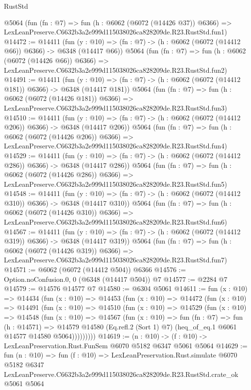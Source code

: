 \begin{lexlean}{RustStd}
\begin{coremodule}
    @5064
    (fun (fn : @7) =>
    fun (h : @6062 (@6072 (@14426 @37)) @6366) =>
    LexLeanPreserve.C6632b3a2e999d115038026ca828209de.R23.RustStd.fun1)
@14472 := @14411
    (fun (y : @10) => (fn : @7) -> (h : @6062 (@6072 (@14412 @66)) @6366) -> @6348 (@14417 @66))
    @5064
    (fun (fn : @7) =>
    fun (h : @6062 (@6072 (@14426 @66)) @6366) =>
    LexLeanPreserve.C6632b3a2e999d115038026ca828209de.R23.RustStd.fun2)
@14491 := @14411
    (fun (y : @10) => (fn : @7) -> (h : @6062 (@6072 (@14412 @181)) @6366) -> @6348 (@14417 @181))
    @5064
    (fun (fn : @7) =>
    fun (h : @6062 (@6072 (@14426 @181)) @6366) =>
    LexLeanPreserve.C6632b3a2e999d115038026ca828209de.R23.RustStd.fun3)
@14510 := @14411
    (fun (y : @10) => (fn : @7) -> (h : @6062 (@6072 (@14412 @206)) @6366) -> @6348 (@14417 @206))
    @5064
    (fun (fn : @7) =>
    fun (h : @6062 (@6072 (@14426 @206)) @6366) =>
    LexLeanPreserve.C6632b3a2e999d115038026ca828209de.R23.RustStd.fun4)
@14529 := @14411
    (fun (y : @10) => (fn : @7) -> (h : @6062 (@6072 (@14412 @286)) @6366) -> @6348 (@14417 @286))
    @5064
    (fun (fn : @7) =>
    fun (h : @6062 (@6072 (@14426 @286)) @6366) =>
    LexLeanPreserve.C6632b3a2e999d115038026ca828209de.R23.RustStd.fun5)
@14548 := @14411
    (fun (y : @10) => (fn : @7) -> (h : @6062 (@6072 (@14412 @310)) @6366) -> @6348 (@14417 @310))
    @5064
    (fun (fn : @7) =>
    fun (h : @6062 (@6072 (@14426 @310)) @6366) =>
    LexLeanPreserve.C6632b3a2e999d115038026ca828209de.R23.RustStd.fun6)
@14567 := @14411
    (fun (y : @10) => (fn : @7) -> (h : @6062 (@6072 (@14412 @319)) @6366) -> @6348 (@14417 @319))
    @5064
    (fun (fn : @7) =>
    fun (h : @6062 (@6072 (@14426 @319)) @6366) =>
    LexLeanPreserve.C6632b3a2e999d115038026ca828209de.R23.RustStd.fun7)
@14571 := @6062 (@6072 (@14412 @504)) @6366
@14576 := Option.noConfusion.{0, 0} (@6348 (@14417 @504)) @7
@14577 := @2284 @7
@14579 := @14576 @14577 @7
@14580 := @6304 @5061
@14611 := fun (x : @10) =>
  @14434
    (fun (x : @10) =>
    @14453
      (fun (x : @10) =>
      @14472
        (fun (x : @10) =>
        @14491
          (fun (x : @10) =>
          @14510
            (fun (x : @10) =>
            @14529
              (fun (x : @10) =>
              @14548
                (fun (x : @10) =>
                @14567
                  (fun (x : @10) =>
                  fun (fn : @7) =>
                  fun (h : @14571) =>
                  @14579
                    @14580
                    (Eq.refl.{2} (Sort 1) @7)
                    (heq_of_eq.{1} @6061 @14577 @14580 @5064)))))))))
@14619 := (n : @10) -> (f : @10) -> LexLeanPreservation.Rust.FunSem @6070 @5182 @6347 @5061 @5064
@14629 := fun (n : @10) =>
  fun (f : @10) =>
  LexLeanPreservation.Rust.simulate
    @6070
    @5182
    @6347
    LexLeanPreserve.C6632b3a2e999d115038026ca828209de.R23.RustStd.crate_ok
    @5061
    @5064
\end{coremodule}
\end{lexlean}

